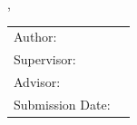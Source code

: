 \begin{titlepage}
  \centering


  \vspace{5mm}
  {\huge\MakeUppercase{\getUniversity{}} \par}

  \vspace{5mm}
  {\large\MakeUppercase{\getSchool{}}, \par}
  \vspace{2mm}
  {\large\MakeUppercase{\getDepartment{}} \par}

  \vspace{20mm}
  {\Large \getDegree{} \par}

  \vspace{15mm}
  {\huge\bfseries \getTitle{} \par}

  \vspace{15mm}
  \begin{tabular}{l l}
    Author:          & \getAuthor{}         \\
    Supervisor:      & \getSupervisor{}     \\
    Advisor:         & \getAdvisor{}        \\
    Submission Date: & \getSubmissionDate{} \\
  \end{tabular}

\end{titlepage}
